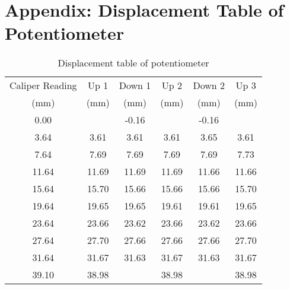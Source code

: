 \section{Appendix: Displacement Table of Potentiometer}
\label{sec:appendix-potentiometer-displacement-table}



\begin{table}[h]
    \centering
    \caption{Displacement table of potentiometer}
    \label{tab:appendix-potentiometer-displacement-table}
    \begin{tabular}{cccccc}
        \hline
        Caliper Reading & Up 1 & Down 1 & Up 2 & Down 2 & Up 3 \\
        (mm) & (mm) & (mm) & (mm) & (mm) & (mm) \\
        \midrule
        0.00 & & -0.16 & & -0.16 & \\
        3.64 & 3.61 & 3.61 & 3.61 & 3.65 & 3.61 \\
        7.64 & 7.69 & 7.69 & 7.69 & 7.69 & 7.73 \\
        11.64 & 11.69 & 11.69 & 11.69 & 11.66 & 11.66 \\
        15.64 & 15.70 & 15.66 & 15.66 & 15.66 & 15.70 \\
        19.64 & 19.65 & 19.65 & 19.61 & 19.61 & 19.65 \\
        23.64 & 23.66 & 23.62 & 23.66 & 23.62 & 23.66 \\
        27.64 & 27.70 & 27.66 & 27.66 & 27.66 & 27.70 \\
        31.64 & 31.67 & 31.63 & 31.67 & 31.63 & 31.67 \\
        39.10 & 38.98 & & 38.98 & & 38.98 \\
        \hline
        \hline
    \end{tabular}
\end{table}

\FloatBarrier
\phantom{a}
